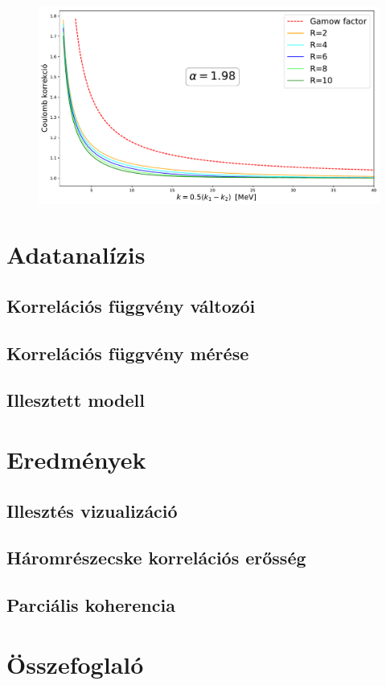 \documentclass[10pt,a4paper]{article}
\numberwithin{equation}{subsection}
\numberwithin{figure}{section}
\begin{document}
\begin{figure}[H]
\centering
\includegraphics[scale=0.55]{pic/Coulomb/C2_R246810_a198.pdf}
\end{figure}


\section{Adatanalízis}
\subsection{Korrelációs függvény változói}
\subsection{Korrelációs függvény mérése}
\subsection{Illesztett modell}

\section{Eredmények}
\subsection{Illesztés vizualizáció}
\subsection{Háromrészecske korrelációs erősség}
\subsection{Parciális koherencia}


\section{Összefoglaló}





\end{document}
